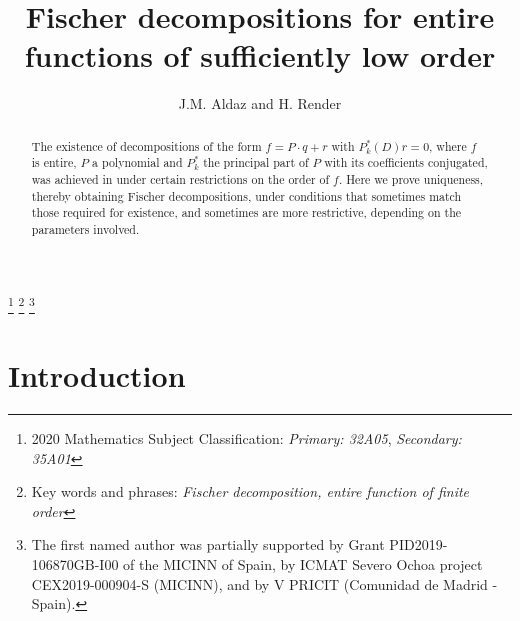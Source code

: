 \documentclass[12pt]{amsart}
\begin{document}
\title[Uniqueness results ]{Fischer decompositions for
entire functions of sufficiently low order}
\author{J.M. Aldaz and H. Render}
\address{H. Render: School of Mathematical Sciences, University College
	Dublin, Dublin 4, Ireland.}
\address{J.M. Aldaz: Instituto de Ciencias Matem\'aticas (CSIC-UAM-UC3M-UCM)
	and Departamento de Matem\'aticas, Universidad Aut\'onoma de Madrid,
	Cantoblanco 28049, Madrid, Spain.}
\thanks{2020 Mathematics Subject Classification: \emph{Primary: 32A05}, 
	\emph{Secondary: 35A01}}
\thanks{Key words and phrases: \emph{Fischer decomposition, entire function of finite order}}
\thanks{The first named author was partially supported by Grant PID2019-106870GB-I00 of the
	MICINN of Spain,  by ICMAT Severo Ochoa project 
	CEX2019-000904-S (MICINN), and by  V PRICIT (Comunidad de Madrid - Spain).}


\maketitle

\begin{abstract} The existence of decompositions of the form $
	f=P\cdot q+r$ with $P_k^{\ast}\left(  D\right)  r=0
$, where $f$ is entire, $P$ a polynomial and  $P^{\ast}_k$ the principal part of $P$ with its coefficients conjugated, was achieved in \cite{AlRe23} under certain restrictions on the order of $f$. Here we prove uniqueness, thereby obtaining Fischer decompositions, under conditions that sometimes match those required for existence, and sometimes are more restrictive, depending on the parameters involved. 
\end{abstract}

\section{Introduction}
\end{document}

